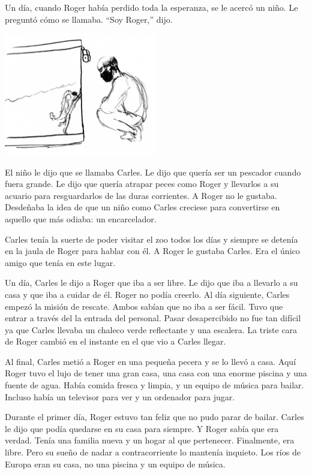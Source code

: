 \documentclass[letterpaper,11pt]{report}
\begin{document}
Un día, cuando Roger había perdido toda la esperanza, se le acercó un niño. Le preguntó cómo se llamaba. “Soy Roger,” dijo.

\begin{center}
    \includegraphics[width=0.5\textwidth]{3}
\end{center}

El niño le dijo que se llamaba Carles. Le dijo que quería ser un pescador cuando fuera grande. Le dijo que quería atrapar peces como Roger y llevarlos a su acuario para resguardarlos de las duras corrientes. A Roger no le gustaba. Desdeñaba la idea de que un niño como Carles creciese para convertirse en aquello que más odiaba: un encarcelador.

Carles tenía la suerte de poder visitar el zoo todos los días y siempre se detenía en la jaula de Roger para hablar con él. A Roger le gustaba Carles. Era el único amigo que tenía en este lugar.

Un día, Carles le dijo a Roger que iba a ser libre. Le dijo que iba a llevarlo a su casa y que iba a cuidar de él. Roger no podía creerlo. Al día siguiente, Carles empezó la misión de rescate. Ambos sabían que no iba a ser fácil. Tuvo que entrar a través del la entrada del personal. Pasar desapercibido no fue tan difícil ya que Carles llevaba un chaleco verde reflectante y una escalera. La triste cara de Roger cambió en el instante en el que vio a Carles llegar.

Al final, Carles metió a Roger en una pequeña pecera y se lo llevó a casa. Aquí Roger tuvo el lujo de tener una gran casa, una casa con una enorme piscina y una fuente de agua. Había comida fresca y limpia, y un equipo de música para bailar. Incluso había un televisor para ver y un ordenador para jugar.

Durante el primer día, Roger estuvo tan feliz que no pudo parar de bailar. Carles le dijo que podía quedarse en su casa para siempre. Y Roger sabía que era verdad. Tenía una familia nueva y un hogar al que pertenecer. Finalmente, era libre.  Pero su sueño de nadar a contracorriente lo mantenía inquieto. Los ríos de Europa eran su casa, no una piscina y un equipo de música.
\end{document}
